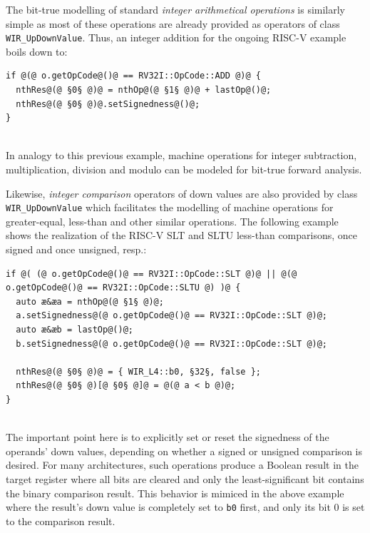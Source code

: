 \begin{enumerate}[resume]
  The bit-true modelling of standard \emph{integer arithmetical operations} is similarly simple as most of these operations are already provided as operators of class \texttt{WIR\_UpDownValue}.
  Thus, an integer addition for the ongoing RISC-V example boils down to: \\
\begin{lstlisting}[style=code,float=!h,xleftmargin=10mm,aboveskip=-0.8 \baselineskip,belowskip=-0.8 \baselineskip]
if @(@ o.getOpCode@()@ == RV32I::OpCode::ADD @)@ {
  nthRes@(@ §0§ @)@ = nthOp@(@ §1§ @)@ + lastOp@()@;
  nthRes@(@ §0§ @)@.setSignedness@()@;
}
\end{lstlisting}
  \\
  In analogy to this previous example, machine operations for integer subtraction, multiplication, division and modulo can be modeled for bit-true forward analysis.

  Likewise, \emph{integer comparison} operators of down values are also provided by class \texttt{WIR\_UpDownValue} which facilitates the modelling of machine operations for greater-equal, less-than and other similar operations.
  The following example shows the realization of the RISC-V SLT and SLTU less-than comparisons, once signed and once unsigned, resp.: \\
\begin{lstlisting}[style=code,float=!h,xleftmargin=10mm,aboveskip=-0.8 \baselineskip,belowskip=-0.8 \baselineskip]
if @( (@ o.getOpCode@()@ == RV32I::OpCode::SLT @)@ || @(@ o.getOpCode@()@ == RV32I::OpCode::SLTU @) )@ {
  auto æ&æa = nthOp@(@ §1§ @)@;
  a.setSignedness@(@ o.getOpCode@()@ == RV32I::OpCode::SLT @)@;
  auto æ&æb = lastOp@()@;
  b.setSignedness@(@ o.getOpCode@()@ == RV32I::OpCode::SLT @)@;

  nthRes@(@ §0§ @)@ = { WIR_L4::b0, §32§, false };
  nthRes@(@ §0§ @)[@ §0§ @]@ = @(@ a < b @)@;
}
\end{lstlisting}
  \\
  The important point here is to explicitly set or reset the signedness of the operands' down values, depending on whether a signed or unsigned comparison is desired.
  For many architectures, such operations produce a Boolean result in the target register where all bits are cleared and only the least-significant bit contains the binary comparison result.
  This behavior is mimiced in the above example where the result's down value is completely set to \texttt{b0} first, and only its bit 0 is set to the comparison result.


\end{enumerate}
